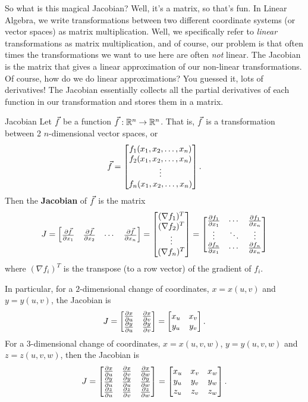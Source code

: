 So what is this magical Jacobian? Well, it's a matrix, so that's fun. In Linear Algebra, we write transformations between two different coordinate systems (or vector spaces) as matrix multiplication. Well, we specifically refer to \textit{linear} transformations as matrix multiplication, and of course, our problem is that often times the transformations we want to use here are often \textit{not} linear. The Jacobian is the matrix that gives a linear approximation of our non-linear transformations. Of course, how do we do linear approximations? You guessed it, lots of derivatives! The Jacobian essentially collects all the partial derivatives of each function in our transformation and stores them in a matrix.

\begin{definition}{Jacobian}
Let $\vec{f}$ be a function $\vec{f}: \mathbb{R}^n\to\mathbb{R}^n$. That is, $\vec{f}$ is a transformation between 2 $n$-dimensional vector spaces, or $$\vec{f}=\begin{bmatrix}f_1(x_1,x_2,\ldots,x_n)\\ f_2(x_1,x_2,\ldots,x_n)\\ \vdots \\  f_n(x_1,x_2,\ldots,x_n)\end{bmatrix}. $$ Then the \textbf{Jacobian} of $\vec{f}$ is the matrix
$$J=\begin{bmatrix}\frac{\partial \vec{f}}{\partial x_1} & \frac{\partial \vec{f}}{\partial x_2} & \cdots & \frac{\partial \vec{f}}{\partial x_n}\end{bmatrix}=\begin{bmatrix}(\nabla f_1)^T\\(\nabla f_2)^T\\ \vdots\\ (\nabla f_n)^T\end{bmatrix}=
\begin{bmatrix}
\frac{\partial f_1}{\partial x_1} & \cdots & \frac{\partial f_1}{\partial x_n} \\
\vdots  & \ddots & \vdots \\
\frac{\partial f_n}{\partial x_1} & \cdots & \frac{\partial f_n}{\partial x_n}
\end{bmatrix}$$ where $(\nabla f_i)^T$ is the transpose (to a row vector) of the gradient of $f_i$.

\vspace{1em}

In particular, for a $2$-dimensional change of coordinates, $x=x(u,v)$ and $y=y(u,v)$, the Jacobian is $$J=\begin{bmatrix}\frac{\partial x}{\partial u} & \frac{\partial x}{\partial v} \\ \frac{\partial y}{\partial u} & \frac{\partial y}{\partial v}\end{bmatrix}=\begin{bmatrix}x_u & x_v \\ y_u & y_v\end{bmatrix}.$$ For a $3$-dimensional change of coordinates, $x=x(u,v,w)$, $y=y(u,v,w)$ and $z=z(u,v,w)$, then the Jacobian is $$J=
\begin{bmatrix}
\frac{\partial x}{\partial u} & \frac{\partial x}{\partial v} & \frac{\partial x}{\partial w}\\
\frac{\partial y}{\partial u} & \frac{\partial y}{\partial u} & \frac{\partial y}{\partial w}\\
\frac{\partial z}{\partial u} & \frac{\partial z}{\partial v} & \frac{\partial z}{\partial w}
\end{bmatrix}=\begin{bmatrix}x_u & x_v & x_w \\ y_u & y_v & y_w \\ z_u & z_v & z_w\end{bmatrix}.$$
\end{definition}

